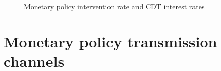\documentclass[
  ignorenonframetext,
]{beamer}
\begin{document}
\begin{frame}{}
\label{section-17}
\begin{figure}


\caption{\label{fig-daily-pir-cdt-90-180-360-col}Monetary policy
intervention rate and CDT interest rates}

\end{figure}%
\end{frame}

\section{Monetary policy transmission
channels}\label{monetary-policy-transmission-channels}
\end{document}
